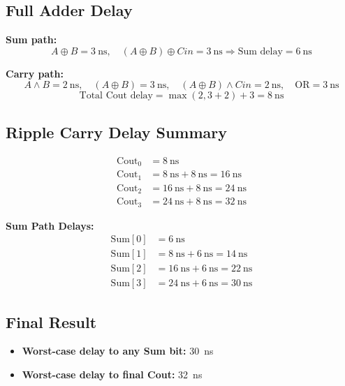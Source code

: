 \documentclass{article}
\begin{document}
\subsection*{Full Adder Delay}

\textbf{Sum path:}
\[
A \oplus B = \SI{3}{\nano\second}, \quad (A \oplus B) \oplus Cin = \SI{3}{\nano\second} \Rightarrow \text{Sum delay} = \SI{6}{\nano\second}
\]

\textbf{Carry path:}
\[
A \land B = \SI{2}{\nano\second}, \quad (A \oplus B) = \SI{3}{\nano\second}, \quad (A \oplus B) \land Cin = \SI{2}{\nano\second}, \quad \text{OR} = \SI{3}{\nano\second}
\]
\[
\text{Total Cout delay} = \max(2, 3+2) + 3 = \SI{8}{\nano\second}
\]

\subsection*{Ripple Carry Delay Summary}
\begin{align*}
\text{Cout}_0 &= \SI{8}{\nano\second} \\
\text{Cout}_1 &= \SI{8}{\nano\second} + \SI{8}{\nano\second} = \SI{16}{\nano\second} \\
\text{Cout}_2 &= \SI{16}{\nano\second} + \SI{8}{\nano\second} = \SI{24}{\nano\second} \\
\text{Cout}_3 &= \SI{24}{\nano\second} + \SI{8}{\nano\second} = \SI{32}{\nano\second}
\end{align*}

\textbf{Sum Path Delays:}
\begin{align*}
\text{Sum}[0] &= \SI{6}{\nano\second} \\
\text{Sum}[1] &= \SI{8}{\nano\second} + \SI{6}{\nano\second} = \SI{14}{\nano\second} \\
\text{Sum}[2] &= \SI{16}{\nano\second} + \SI{6}{\nano\second} = \SI{22}{\nano\second} \\
\text{Sum}[3] &= \SI{24}{\nano\second} + \SI{6}{\nano\second} = \SI{30}{\nano\second}
\end{align*}

\subsection*{Final Result}
\begin{itemize}
  \item \textbf{Worst-case delay to any Sum bit:} \SI{30}{\nano\second}
  \item \textbf{Worst-case delay to final Cout:} \SI{32}{\nano\second}
\end{itemize}
\end{document}

